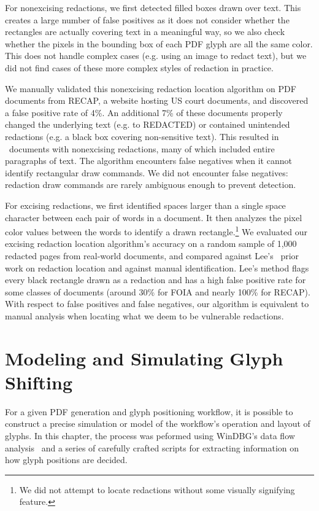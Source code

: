 For nonexcising redactions, we first detected filled boxes drawn over text.
This creates a large number of false positives as it does not consider whether the rectangles are actually covering text in a meaningful way, so we also check whether the pixels in the bounding box of each PDF glyph are all the same color.
This does not handle complex cases (e.g. using an image to redact text), but we did not find cases of these more complex styles of redaction in practice.

We manually validated this nonexcising redaction location algorithm on PDF documents from RECAP, a website hosting US court documents, and discovered a false positive rate of 4\%.
An additional 7\% of these documents properly changed the underlying text (e.g. to REDACTED) or contained unintended redactions (e.g. a black box covering non-sensitive text).
This resulted in \numRECAPredactionDocs\ documents with nonexcising redactions, many of which included entire paragraphs of text.
The algorithm encounters false negatives when it cannot identify rectangular draw commands.
We did not encounter false negatives: redaction draw commands are rarely ambiguous enough to prevent detection.

For excising redactions, we first identified spaces larger than a single space character between each pair of words in a document.
It then analyzes the pixel color values between the words to identify a drawn rectangle.\footnote{
    We did not attempt to locate redactions without some visually signifying feature.
}
We evaluated our excising redaction location algorithm's accuracy on a random sample of 1,000 redacted pages from real-world documents, and compared against Lee's~\cite{timblee} prior work on redaction location and against manual identification.
Lee's method flags every black rectangle drawn as a redaction and has a high false positive rate for some classes of documents (around 30\% for FOIA and nearly 100\% for RECAP).
With respect to false positives and false negatives, our algorithm is equivalent to manual analysis when locating what we deem to be vulnerable redactions.

\section{Modeling and Simulating Glyph Shifting}

For a given PDF generation and glyph positioning workflow, it is possible to construct a precise simulation or model of the workflow's operation and layout of glyphs.
In this chapter, the process was peformed using WinDBG's data flow analysis~\cite{timetravel} and a series of carefully crafted scripts for extracting information on how glyph positions are decided.

